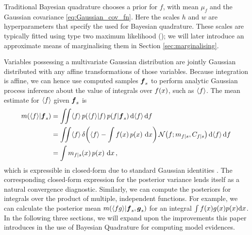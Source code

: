 \documentclass{article} %
\begin{document}
Traditional Bayesian quadrature chooses a \gpb prior for $f$, with mean $\mu_f$ and the Gaussian covariance \eqref{eq:Gaussian_cov_fn}. Here the scales $h$ and $w$ are hyperparameters that specify the  \gpb used for Bayesian quadrature. These scales are typically fitted using type two maximum likelihood (); we will later introduce an approximate means of marginalising them in Section \ref{sec:marginalising}.


Variables possessing a multivariate Gaussian distribution are jointly Gaussian distributed with any affine transformations of those variables. Because integration is affine, we can hence use computed samples $\vf_s$ to perform analytic Gaussian process inference about the value of integrals over $f(\lfv)$, such as $\inty{f}$. The mean estimate for $\inty{f}$ given $\vf_s$ is
%
\begin{align} \label{eq:mean_inty_f}
\mean{\inty{f}}{\vf_s}
& 
=\iint \inty{f}\,\p{\inty{f}}{f}\p{f}{\vf_s} \ud \inty{f} \,\ud f                                                                                                                                                               \nonumber\\
&
 =\iint \inty{f}\,\dd{\inty{f}}{\int f(\lfv)\,\po{\lfv}\,\ud\lfv}
\N{f}{\meancondfn{f}{s}}{C_{f|s}} \ud \inty{f} \,\ud f \nonumber\\
&
 = \int \meancondfn{f}{s}(\lfv)\,\po{\lfv}\,\ud\lfv
\,,
\end{align}
which is expressible in closed-form due to standard Gaussian identities \cite{BZMonteCarlo}.
%
The corresponding closed-form expression for the posterior variance lends itself as a natural convergence diagnostic. Similarly, we can compute the posteriors for integrals over the product of multiple, independent functions. For example, we can calculate the posterior mean 
$\mean{\inty{f g}}{\vf_s, \vect{g}_s}$ for an integral $\int f(x) g(x) p(x) \ud x$. 
 In the following three sections, we will expand upon the improvements this paper introduces in the use of Bayesian Quadrature for computing model evidences.
\end{document}
